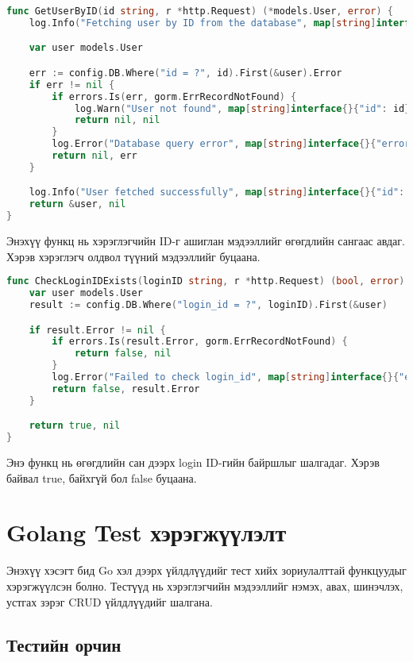 \begin{lstlisting}[language=Go, caption=Get user by ID function, frame=single]
func GetUserByID(id string, r *http.Request) (*models.User, error) {
	log.Info("Fetching user by ID from the database", map[string]interface{}{"id": id}, r)

	var user models.User

	err := config.DB.Where("id = ?", id).First(&user).Error
	if err != nil {
		if errors.Is(err, gorm.ErrRecordNotFound) {
			log.Warn("User not found", map[string]interface{}{"id": id}, r)
			return nil, nil
		}
		log.Error("Database query error", map[string]interface{}{"error": err.Error()}, r)
		return nil, err
	}

	log.Info("User fetched successfully", map[string]interface{}{"id": id}, r)
	return &user, nil
}
\end{lstlisting}

Энэхүү функц нь хэрэглэгчийн ID-г ашиглан мэдээллийг өгөгдлийн сангаас авдаг. Хэрэв хэрэглэгч олдвол түүний мэдээллийг буцаана.

\begin{lstlisting}[language=Go, caption=Check if login ID exists function, frame=single]
func CheckLoginIDExists(loginID string, r *http.Request) (bool, error) {
	var user models.User
	result := config.DB.Where("login_id = ?", loginID).First(&user)

	if result.Error != nil {
		if errors.Is(result.Error, gorm.ErrRecordNotFound) {
			return false, nil
		}
		log.Error("Failed to check login_id", map[string]interface{}{"error": result.Error.Error()}, r)
		return false, result.Error 
	}

	return true, nil 
}
\end{lstlisting}

Энэ функц нь өгөгдлийн сан дээрх login ID-гийн байршлыг шалгадаг. Хэрэв байвал true, байхгүй бол false буцаана.
\pagebreak




\section{Golang Test хэрэгжүүлэлт}

Энэхүү хэсэгт бид Go хэл дээрх үйлдлүүдийг тест хийх зориулалттай функцуудыг хэрэгжүүлсэн болно. Тестүүд нь хэрэглэгчийн мэдээллийг нэмэх, авах, шинэчлэх, устгах зэрэг CRUD үйлдлүүдийг шалгана.

\subsection{Тестийн орчин}

